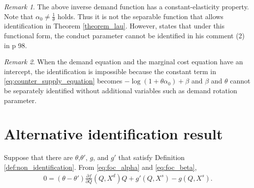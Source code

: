 \documentclass[11pt, a4paper]{article}
\theoremstyle{remark}
\newtheorem{remark}{Remark}
\begin{document}
\begin{remark}
    The above inverse demand function has a constant-elasticity property. 
    Note that $\alpha_0 \ne \frac{1}{\theta}$ holds.
    Thus it is not the separable function that allows identification in Theorem \ref{theorem_lau}.
    However, \citet{lau1982identifying} states that under this functional form, the conduct parameter cannot be identified in his comment (2) in p 98.
\end{remark}

\begin{remark}
    When the demand equation and the marginal cost equation have an intercept, the identification is impossible because the constant term in \eqref{eq:counter_supply_equation} becomes $-\log(1+\theta \alpha_0) + \beta$ and $\beta$ and $\theta$ cannot be separately identified without additional variables such as demand rotation parameter.
\end{remark}

\section{Alternative identification result}

Suppose that there are $\theta$,$\theta'$, $g$, and $g'$ that satisfy Definition \ref{def:non_identification}.
From \eqref{eq:foc_alpha} and \eqref{eq:foc_beta},
\begin{align}
    0 = (\theta - \theta')\frac{\partial f}{\partial Q}(Q,X^{d})Q + g'(Q,X^{s}) - g(Q,X^{s}). 
\end{align}
\end{document}
